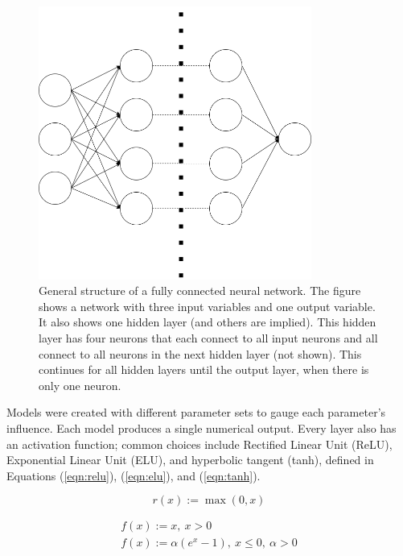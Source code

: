 \begin{figure}[H]
    \centering
    \includegraphics[width=0.8\textwidth]{figures/neural_network.drawio.png}
    \caption[General structure of a fully connected neural network]{General structure of a fully connected neural network. The figure shows a network with three input variables and one output variable. It also shows one hidden layer (and others are implied). This hidden layer has four neurons that each connect to all input neurons and all connect to all neurons in the next hidden layer (not shown). This continues for all hidden layers until the output layer, when there is only one neuron.}
    \label{fig:nn_structure}
\end{figure}

Models were created with different parameter sets to gauge each parameter’s influence. Each model produces a single numerical output. Every layer also has an activation function; common choices include Rectified Linear Unit (ReLU), Exponential Linear Unit (ELU), and hyperbolic tangent (tanh), defined in Equations (\ref{eqn:relu}), (\ref{eqn:elu}), and (\ref{eqn:tanh}).

\begin{equation}
    \label{eqn:relu}
    r(x):=\max(0, x)
\end{equation}

\begin{align}
    \label{eqn:elu}
    f(x) := x,\ x > 0\\
    f(x) := \alpha (e^x-1),\ x\leq 0,\ \alpha > 0
\end{align}

